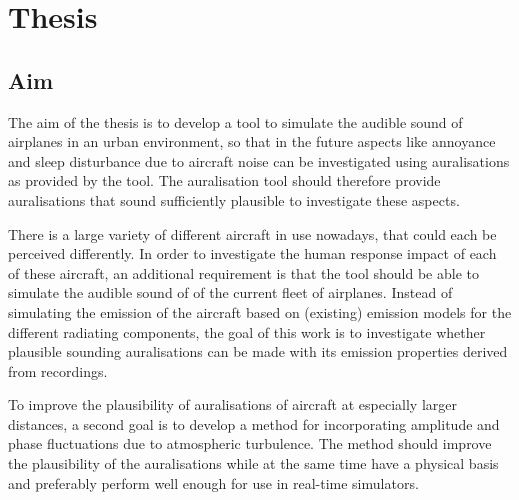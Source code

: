 \newpage
\section{Thesis}


\subsection{Aim}


The aim of the thesis is to develop a tool to simulate the audible sound of
airplanes in an urban environment, so that in the future aspects like annoyance
and sleep disturbance due to aircraft noise can be investigated using
auralisations as provided by the tool. The auralisation tool should therefore
provide auralisations that sound sufficiently plausible to investigate these
aspects.

There is a large variety of different aircraft in use nowadays, that could each
be perceived differently. In order to investigate the human response impact of
each of these aircraft, an additional requirement is that the tool should be
able to simulate the audible sound of of the current fleet of airplanes. Instead
of simulating the emission of the aircraft based on (existing) emission models
for the different radiating components, the goal of this work is to investigate
whether plausible sounding auralisations can be made with its emission
properties derived from recordings.

To improve the plausibility of auralisations of aircraft at especially larger
distances, a second goal is to develop a method for incorporating amplitude and
phase fluctuations due to atmospheric turbulence. The method should improve the
plausibility of the auralisations while at the same time have a physical basis
and preferably perform well enough for use in real-time simulators.


%
%
%

